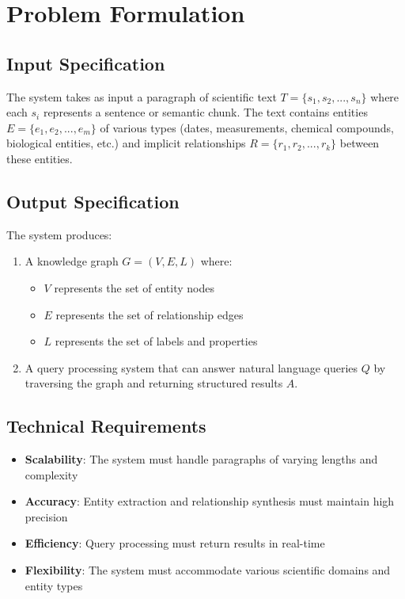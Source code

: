 \documentclass[conference]{IEEEtran}
\begin{document}
\section{Problem Formulation}

\subsection{Input Specification}
The system takes as input a paragraph of scientific text $T = \{s_1, s_2, ..., s_n\}$ where each $s_i$ represents a sentence or semantic chunk. The text contains entities $E = \{e_1, e_2, ..., e_m\}$ of various types (dates, measurements, chemical compounds, biological entities, etc.) and implicit relationships $R = \{r_1, r_2, ..., r_k\}$ between these entities.

\subsection{Output Specification}
The system produces:
\begin{enumerate}
\item A knowledge graph $G = (V, E, L)$ where:
\begin{itemize}
\item $V$ represents the set of entity nodes
\item $E$ represents the set of relationship edges
\item $L$ represents the set of labels and properties
\end{itemize}
\item A query processing system that can answer natural language queries $Q$ by traversing the graph and returning structured results $A$.
\end{enumerate}

\subsection{Technical Requirements}
\begin{itemize}
\item \textbf{Scalability}: The system must handle paragraphs of varying lengths and complexity
\item \textbf{Accuracy}: Entity extraction and relationship synthesis must maintain high precision
\item \textbf{Efficiency}: Query processing must return results in real-time
\item \textbf{Flexibility}: The system must accommodate various scientific domains and entity types
\end{itemize}
\end{document}
